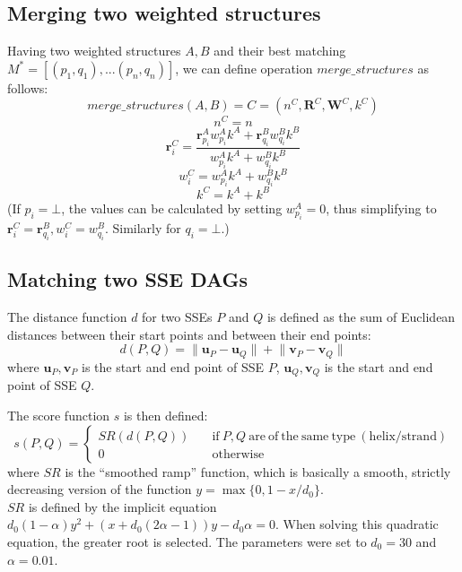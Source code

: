 \documentclass{article}
\begin{document}
\subsection{Merging two weighted structures}
\label{sec:appendix_ws_merging}

Having two weighted structures \(A, B\) and their best matching
\(M^* = [(p_1, q_1), ... (p_n, q_n)]\), we can define 
operation \(merge\_structures\) as follows:
  \[  merge\_structures(A, B) = C = (n^C, \mathbf{R}^C, \mathbf{W}^C, k^C)  \]
  \[  n^C = n  \]
  \[  \mathbf{r}^C_i = \frac {\mathbf{r}^A_{p_i} w^A_{p_i} k^A + \mathbf{r}^B_{q_i} w^B_{q_i} k^B} {w^A_{p_i} k^A + w^B_{q_i} k^B}  \]
  \[  w^C_i = w^A_{p_i} k^A + w^B_{q_i} k^B  \]
  \[  k^C = k^A + k^B  \]
(If \(p_i=\bot\), the values can be calculated by setting
\(w^A_{p_i} = 0\), thus simplifying to
\(\mathbf{r}^C_i = \mathbf{r}^B_{q_i}, w^C_i = w^B_{q_i}\). Similarly for \(q_i=\bot\).)




\subsection{Matching two SSE DAGs}
\label{sec:appendix_matching_dags}

The distance function \(d\) for two SSEs \(P\) and \(Q\) is defined 
as the sum of Euclidean distances between their start points and between their end points:
  \[  d(P, Q) = \lVert \mathbf{u}_P - \mathbf{u}_Q \rVert + \lVert \mathbf{v}_P - \mathbf{v}_Q \rVert  \]
where \(\mathbf{u}_P, \mathbf{v}_P\) is the start and end point of SSE \(P\), 
\(\mathbf{u}_Q, \mathbf{v}_Q\) is the start and end point of SSE \(Q\).

The score function \(s\) is then defined:
  \[
    s(P, Q) = \begin{cases}
                SR(d(P, Q)) \quad & \mathrm{if}\ P, Q\ \mathrm{are\ of\ the\ same\ type\ (helix/strand)} \\
                0           \quad & \mathrm{otherwise}
              \end{cases}
  \]
where \(SR\) is the ``smoothed ramp'' function, which is basically 
a smooth, strictly decreasing version of the function \(y = \max\{0, 1 - x/d_0\} \). \\
\(SR\) is defined by the implicit equation 
\(  d_0 (1 - \alpha) y^2 + (x + d_0 (2\alpha - 1)) y - d_0 \alpha = 0  \).
When solving this quadratic equation, the greater root is selected.
The parameters were set to \(d_0 = 30\) and \(\alpha = 0.01\).
\end{document}
